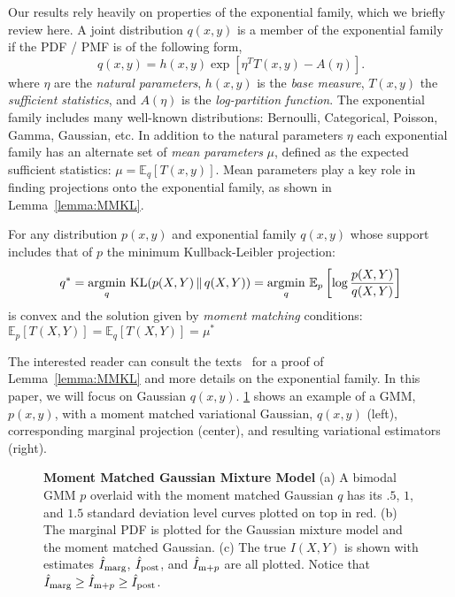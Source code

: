 Our results rely heavily on properties of the exponential family,
which we briefly review here.  A joint distribution $q(x,y)$ is a
member of the exponential family if the PDF / PMF is of the following
form,
\begin{equation}\label{eq:expfam}
  q(x,y) = h(x,y) \exp \left[\eta^TT(x,y)-A(\eta)\right].
\end{equation}
where $\eta$ are the \emph{natural parameters}, $h(x,y)$ is the \emph{base measure},
$T(x,y)$ the \emph{sufficient statistics}, and $A(\eta)$ is the
\emph{log-partition function}.
The exponential family includes many well-known distributions:
Bernoulli, Categorical, Poisson, Gamma, Gaussian, etc.  In addition to
the natural parameters $\eta$ each exponential family has an alternate
set of \emph{mean parameters} $\mu$, defined as the expected
sufficient statistics: $\mu = \mathbb{E}_q[ T(x,y) ]$. Mean parameters
play a key role in finding projections onto the exponential family, as
shown in Lemma~\ref{lemma:MMKL}.
\begin{lemma}\label{lemma:MMKL}
  For any distribution $p(x,y)$ and exponential family $q(x,y)$ whose
  support includes that of $p$ the minimum Kullback-Leibler projection:
  \[
    q^* = \operatorname*{argmin}_q \, \mathrm{KL}(p(X,Y)\,\|\,q(X,Y))
  = \operatorname*{argmin}_q \, \mathbb{E}_p\left[ \log \frac{p(X,Y)}{q(X,Y)} \right]
  \]
  is convex and the solution given by \emph{moment matching} conditions:
  $\mathbb{E}_p[T(X,Y)] = \mathbb{E}_q[ T(X,Y) ] = \mu^*$
\end{lemma}


The interested reader can consult the texts~\cite{bishop2006pattern,
murphy2012machine} for a proof of Lemma~\ref{lemma:MMKL} and more
details on the exponential family.  In this paper, we will focus on
Gaussian $q(x,y)$. \FIG\ref{fig:GMMex} shows an example of a GMM,
$p(x,y)$, with a moment matched variational Gaussian, $q(x,y)$ (left),
corresponding marginal projection (center), and resulting variational
estimators (right).
\begin{figure*}[!t]
  \centering {}  

  \caption{\small\textbf{Moment Matched Gaussian Mixture Model} (a) A
  bimodal GMM $p$ overlaid with the moment matched Gaussian $q$ has
  its $.5$, $1$, and $1.5$ standard deviation level curves plotted on top in red. (b)
  The marginal PDF is plotted for the Gaussian mixture model and the
  moment matched Gaussian. (c) The true $I(X,Y)$ is shown with
  estimates $\hat{I}_{\text{marg}}$, $\hat{I}_{\text{post}}$, and $\hat{I}_{\text{m}+p}$ are all plotted. Notice
  that $\hat{I}_{\text{marg}} \geq \hat{I}_{\text{m}+p} \geq \hat{I}_{\text{post}}$.}

  \label{fig:GMMex}
\end{figure*}


